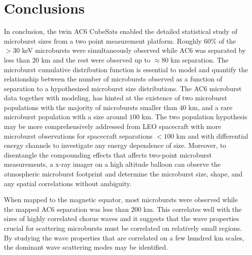 \documentclass[draft]{agujournal2019}
\begin{document}
\section{Conclusions}
In conclusion, the twin AC6 CubeSats enabled the detailed statistical study of microburst sizes from a two point measurement platform. Roughly $60 \%$ of the $> 30$ keV microbursts were simultaneously observed while AC6 was separated by less than $20$ km and the rest were observed up to $\approx 80$ km separation. The microburst cumulative distribution function is essential to model and quantify the relationship between the number of microbursts observed as a function of separation to a hypothesized microburst size distributions. The AC6 microburst data together with modeling, has hinted at the existence of two microburst populations with the majority of microbursts smaller than $40$ km, and a rare microburst population with a size around $100$ km. The two population hypothesis may be more comprehensively addressed from LEO spacecraft with more microburst observations for spacecraft separations $< 100$ km and with differential energy channels to investigate any energy dependence of size. Moreover, to disentangle the compounding effects that affects two-point microburst measurements, a x-ray imager on a high altitude balloon can observe the atmospheric microburst footprint and determine the microburst size, shape, and any spatial correlations without ambiguity. 

When mapped to the magnetic equator, most microbursts were observed while the mapped AC6 separation was less than $200$ km. This correlates well with the sizes of highly correlated chorus waves and it suggests that the wave properties crucial for scattering microbursts must be correlated on relatively small regions. By studying the wave properties that are correlated on a few hundred km scales, the dominant wave scattering modes may be identified.


%
%
%
%
%
%
%
%
\end{document}
